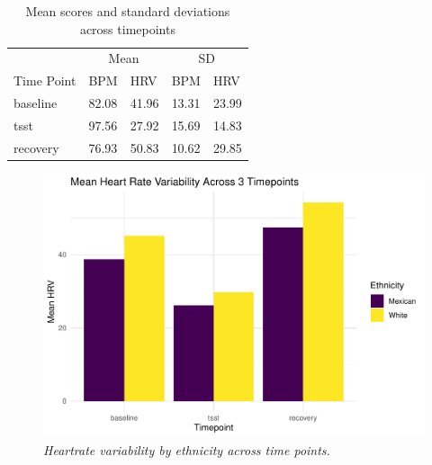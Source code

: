 \documentclass[
  man, fleqn, noextraspace]{apa6}
\begin{document}
\newpage

\begin{table}[tbp]
\begin{center}
\begin{threeparttable}
\caption{\label{tab:unnamed-chunk-1}Mean scores and standard deviations across timepoints}
\begin{tabular}{lllll}
\toprule
 & \multicolumn{2}{c}{Mean} & \multicolumn{2}{c}{SD} \\
\cmidrule(r){2-3} \cmidrule(r){4-5}
Time Point & BPM & HRV & BPM & HRV\\
\midrule
baseline & 82.08 & 41.96 & 13.31 & 23.99\\
tsst & 97.56 & 27.92 & 15.69 & 14.83\\
recovery & 76.93 & 50.83 & 10.62 & 29.85\\
\bottomrule
\end{tabular}
\end{threeparttable}
\end{center}
\end{table}

\begin{figure}
\centering
\includegraphics{PAPAJA_Final_class_project_files/figure-latex/unnamed-chunk-2-1.pdf}
\caption{\label{fig:unnamed-chunk-2}\emph{Heartrate variability by ethnicity across time points.}}
\end{figure}
\end{document}
